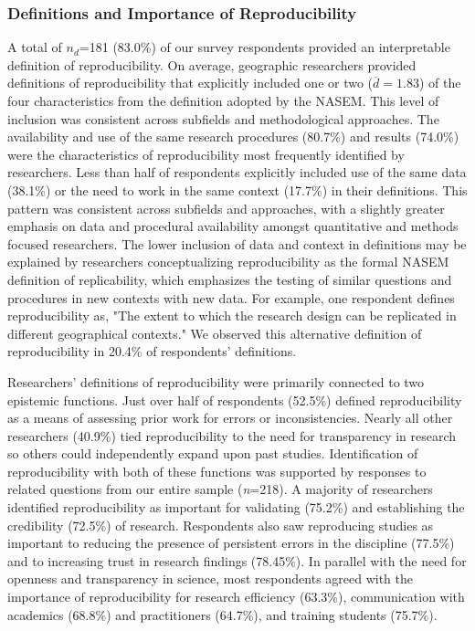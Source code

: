 \documentclass[]{interact}
\theoremstyle{plain}%
\theoremstyle{definition}
\theoremstyle{remark}
\begin{document}
\subsubsection*{Definitions and Importance of Reproducibility}
A total of \textit{$n_{d}$}=181 (83.0\%) of our survey respondents provided an interpretable definition of reproducibility.  
On average, geographic researchers provided definitions of reproducibility that explicitly included one or two ($\overline{d}=1.83$) of the four characteristics from the definition adopted by the NASEM.
This level of inclusion was consistent across subfields and methodological approaches.
The availability and use of the same research procedures (80.7\%) and results (74.0\%) were the characteristics of reproducibility most frequently identified by researchers. 
Less than half of respondents explicitly included use of the same data (38.1\%) or the need to work in the same context (17.7\%) in their definitions. 
This pattern was consistent across subfields and approaches, with a slightly greater emphasis on data and procedural availability amongst quantitative and methods focused researchers.
The lower inclusion of data and context in definitions may be explained by researchers conceptualizing reproducibility as the formal NASEM definition of replicability, which emphasizes the testing of similar questions and procedures in new contexts with new data. 
For example, one respondent defines reproducibility as, "The extent to which the research design can be replicated in different geographical contexts."
We observed this alternative definition of reproducibility in 20.4\% of respondents' definitions.

Researchers' definitions of reproducibility were primarily connected to two epistemic functions.
Just over half of respondents (52.5\%) defined reproducibility as a means of assessing prior work for errors or inconsistencies.
Nearly all other researchers (40.9\%) tied reproducibility to the need for transparency in research so others could independently expand upon past studies.
Identification of reproducibility with both of these functions was supported by responses to related questions from our entire sample (\textit{n}=218). 
A majority of researchers identified reproducibility as important for validating (75.2\%) and establishing the credibility (72.5\%) of research.  
Respondents also saw reproducing studies as important to reducing the presence of persistent errors in the discipline (77.5\%) and to increasing trust in research findings (78.45\%).
In parallel with the need for openness and transparency in science, most respondents agreed with the importance of reproducibility for research efficiency (63.3\%), communication with academics (68.8\%) and practitioners (64.7\%), and training students (75.7\%).
\end{document}
